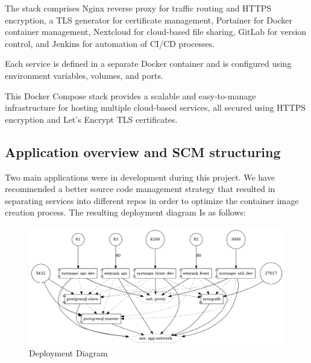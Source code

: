 The stack comprises Nginx reverse proxy for traffic routing and HTTPS encryption, a TLS generator for certificate management, Portainer for Docker container management, Nextcloud for cloud-based file sharing, GitLab for version control, and Jenkins for automation of CI/CD processes.

Each service is defined in a separate Docker container and is configured using environment variables, volumes, and ports.

This Docker Compose stack provides a scalable and easy-to-manage infrastructure for hosting multiple cloud-based services, all secured using HTTPS encryption and Let's Encrypt TLS certificates. 

\newpage

\subsection{Application overview and SCM structuring}

Two main applications were in development during this project. We have recommended a better source code management strategy that resulted in separating services into different repos in order to optimize the container image creation process. The resulting deployment diagram Is as follows: 

 \begin{figure}[H]\centering
\includegraphics[width=1.0\textwidth,angle=00]{assets/f10.png}
\caption{ Deployment Diagram }
\label{fig:DeploymentDiagram}
\end{figure}

